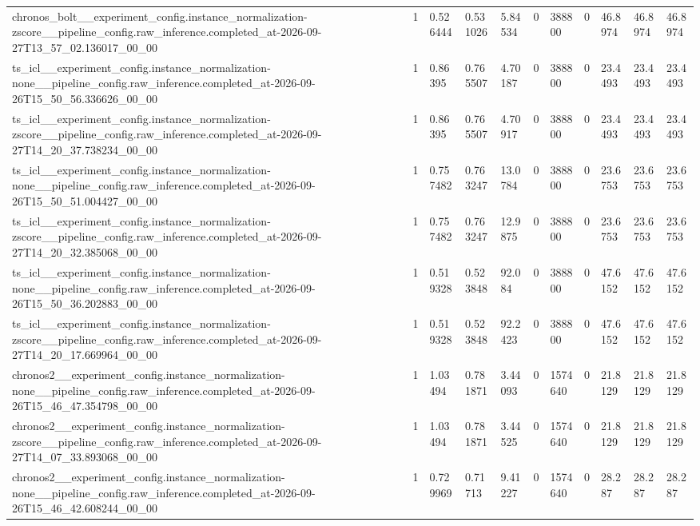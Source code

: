 \begin{tabular}{lllllllllll}
chronos\_bolt\_\_experiment\_config.instance\_normalization-zscore\_\_pipeline\_config.raw\_inference.completed\_at-2026-09-27T13\_57\_02.136017\_00\_00 & 1 & 0.526444 & 0.531026 & 5.84534 & 0 & 388800 & 0 & 46.8974 & 46.8974 & 46.8974 \\
ts\_icl\_\_experiment\_config.instance\_normalization-none\_\_pipeline\_config.raw\_inference.completed\_at-2026-09-26T15\_50\_56.336626\_00\_00 & 1 & 0.86395 & 0.765507 & 4.70187 & 0 & 388800 & 0 & 23.4493 & 23.4493 & 23.4493 \\
ts\_icl\_\_experiment\_config.instance\_normalization-zscore\_\_pipeline\_config.raw\_inference.completed\_at-2026-09-27T14\_20\_37.738234\_00\_00 & 1 & 0.86395 & 0.765507 & 4.70917 & 0 & 388800 & 0 & 23.4493 & 23.4493 & 23.4493 \\
ts\_icl\_\_experiment\_config.instance\_normalization-none\_\_pipeline\_config.raw\_inference.completed\_at-2026-09-26T15\_50\_51.004427\_00\_00 & 1 & 0.757482 & 0.763247 & 13.0784 & 0 & 388800 & 0 & 23.6753 & 23.6753 & 23.6753 \\
ts\_icl\_\_experiment\_config.instance\_normalization-zscore\_\_pipeline\_config.raw\_inference.completed\_at-2026-09-27T14\_20\_32.385068\_00\_00 & 1 & 0.757482 & 0.763247 & 12.9875 & 0 & 388800 & 0 & 23.6753 & 23.6753 & 23.6753 \\
ts\_icl\_\_experiment\_config.instance\_normalization-none\_\_pipeline\_config.raw\_inference.completed\_at-2026-09-26T15\_50\_36.202883\_00\_00 & 1 & 0.519328 & 0.523848 & 92.084 & 0 & 388800 & 0 & 47.6152 & 47.6152 & 47.6152 \\
ts\_icl\_\_experiment\_config.instance\_normalization-zscore\_\_pipeline\_config.raw\_inference.completed\_at-2026-09-27T14\_20\_17.669964\_00\_00 & 1 & 0.519328 & 0.523848 & 92.2423 & 0 & 388800 & 0 & 47.6152 & 47.6152 & 47.6152 \\
chronos2\_\_experiment\_config.instance\_normalization-none\_\_pipeline\_config.raw\_inference.completed\_at-2026-09-26T15\_46\_47.354798\_00\_00 & 1 & 1.03494 & 0.781871 & 3.44093 & 0 & 1574640 & 0 & 21.8129 & 21.8129 & 21.8129 \\
chronos2\_\_experiment\_config.instance\_normalization-zscore\_\_pipeline\_config.raw\_inference.completed\_at-2026-09-27T14\_07\_33.893068\_00\_00 & 1 & 1.03494 & 0.781871 & 3.44525 & 0 & 1574640 & 0 & 21.8129 & 21.8129 & 21.8129 \\
chronos2\_\_experiment\_config.instance\_normalization-none\_\_pipeline\_config.raw\_inference.completed\_at-2026-09-26T15\_46\_42.608244\_00\_00 & 1 & 0.729969 & 0.71713 & 9.41227 & 0 & 1574640 & 0 & 28.287 & 28.287 & 28.287 \\

\end{tabular}
